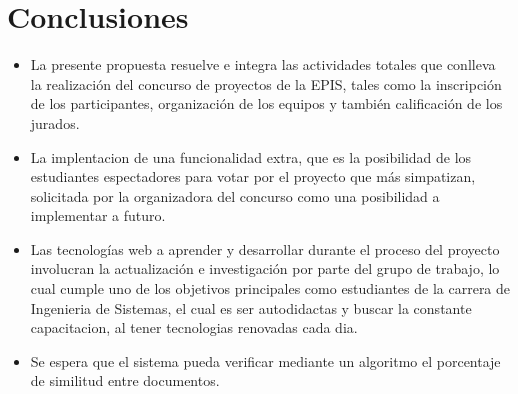 \documentclass[%
 reprint,
 amsmath,amssymb,
 aps,
]{revtex4-1}
\begin{document}
\section{Conclusiones}

\begin{itemize}
\item La presente propuesta resuelve e integra las actividades totales que conlleva la realización del concurso de proyectos de la EPIS, tales como la inscripción de los participantes, organización de los equipos y también calificación de los jurados. 

\item La implentacion de una funcionalidad extra, que es la posibilidad de los estudiantes espectadores  para votar por el proyecto que más simpatizan,  solicitada por la organizadora del concurso como una posibilidad a implementar a futuro. 

\item Las tecnologías web a aprender y desarrollar durante el proceso del proyecto involucran la actualización e investigación por parte del grupo de trabajo, lo cual cumple uno de los objetivos principales como estudiantes de la carrera de Ingenieria de Sistemas, el cual es ser autodidactas y buscar la constante capacitacion, al tener tecnologias renovadas cada dia.

\item Se espera que el sistema pueda verificar mediante un algoritmo el porcentaje de similitud entre documentos.


 

\end{itemize}


%
%
\end{document}
